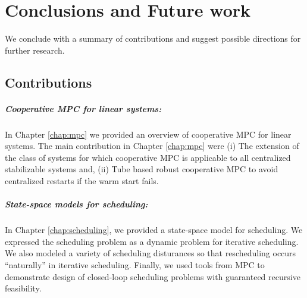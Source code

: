 \chapter{Conclusions and Future work}
\label{chap:conclusions}
We conclude with a summary of contributions and suggest possible
directions for further research.

\section*{Contributions}

\paragraph{Cooperative MPC for linear systems:} In Chapter
\ref{chap:mpc} we provided an overview of cooperative MPC for linear
systems. The main contribution in Chapter \ref{chap:mpc} were (i) The
extension of the class of systems for which cooperative MPC is
applicable to all centralized  stabilizable systems and, (ii) Tube based robust
cooperative MPC to avoid centralized restarts if the warm start fails.

\paragraph{State-space models for scheduling:} In Chapter
\ref{chap:scheduling}, we provided a state-space model for
scheduling. We expressed the scheduling problem as a dynamic problem
for iterative scheduling. We also modeled a variety of scheduling
disturances so that rescheduling occurs ``naturally'' in iterative
scheduling. Finally, we used tools from MPC to demonstrate design of closed-loop scheduling
problems with guaranteed recursive feasibility.

